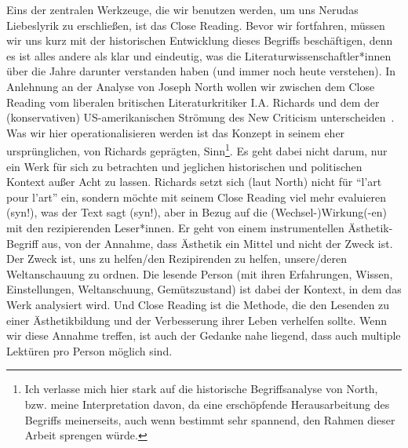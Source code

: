 Eins der zentralen Werkzeuge, die wir benutzen werden, um uns Nerudas Liebeslyrik zu erschließen, ist das Close Reading.
Bevor wir fortfahren, müssen wir uns kurz mit der historischen Entwicklung dieses Begriffs beschäftigen, denn es ist alles andere als klar und eindeutig, was die Literaturwissenschaftler*innen über die Jahre darunter verstanden haben (und immer noch heute verstehen).
In Anlehnung an der Analyse von Joseph North wollen wir zwischen dem Close Reading vom liberalen britischen Literaturkritiker I.A. Richards und dem der (konservativen) US-amerikanischen Strömung des New Criticism unterscheiden~\cite{North2013}.
Was wir hier operationalisieren werden ist das Konzept in seinem eher ursprünglichen, von Richards geprägten, Sinn\footnote{Ich verlasse mich hier stark auf die historische Begriffsanalyse von North, bzw. meine Interpretation davon, da eine erschöpfende Herausarbeitung des Begriffs meinerseits, auch wenn bestimmt sehr spannend, den Rahmen dieser Arbeit sprengen würde.}.
Es geht dabei nicht darum, nur ein Werk für sich zu betrachten und jeglichen historischen und politischen Kontext außer Acht zu lassen.
Richards setzt sich (laut North) nicht für ``l'art pour l'art'' ein, sondern möchte mit seinem Close Reading viel mehr evaluieren (syn!), was der Text sagt (syn!), aber in Bezug auf die (Wechsel-)Wirkung(-en) mit den rezipierenden Leser*innen.
Er geht von einem instrumentellen Ästhetik-Begriff aus, von der Annahme, dass Ästhetik ein Mittel und nicht der Zweck ist.
Der Zweck ist, uns zu helfen/den Rezipirenden zu helfen, unsere/deren Weltanschauung zu ordnen.
Die lesende Person (mit ihren Erfahrungen, Wissen, Einstellungen, Weltanschuung, Gemütszustand) ist dabei der Kontext, in dem das Werk analysiert wird.
Und Close Reading ist die Methode, die den Lesenden zu einer Ästhetikbildung und der Verbesserung ihrer Leben verhelfen sollte.
Wenn wir diese Annahme treffen, ist auch der Gedanke nahe liegend, dass auch multiple Lektüren pro Person möglich sind.


